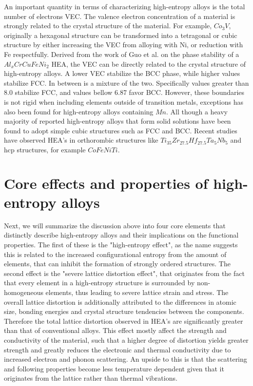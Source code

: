 An important quantity in terms of characterizing high-entropy alloys is the total number of electrons VEC. The valence electron concentration of a material is strongly related to the crystal structure of the material. For example, $Co_3V$, originally a hexagonal structure can be transformed into a tetragonal or cubic structure by either increasing the VEC from alloying with Ni, or reduction with Fe respectfully. Derived from the work of Guo et al. on the phase stability of a $Al_xCrCuFeNi_2$ HEA, the VEC can be directly related to the crystal structure of high-entropy alloys. A lower VEC stabilize the BCC phase, while higher values stabilize FCC. In between is a mixture of the two. Specifically values greater than 8.0 stabilize FCC, and values bellow 6.87 favor BCC. However, these boundaries is not rigid when including elements outside of transition metals, exceptions has also been found for high-entropy alloys containing $Mn$. All though a heavy majority of reported high-entropy alloys that form solid solutions have been found to adopt simple cubic structures such as FCC and BCC. Recent studies have observed HEA's in orthorombic structures like $Ti_{35}Zr_{27.5}Hf_{27.5}Ta_5Nb_5$ and hcp structures, for example $CoFeNiTi$.

\section{Core effects and properties of high-entropy alloys}
Next, we will summarize the discussion above into four core elements that distinctly describe high-entropy alloys and their implications on the functional properties. The first of these is the "high-entropy effect", as the name suggests this is related to the increased configurational entropy from the amount of elements, that can inhibit the formation of strongly ordered structures. The second effect is the "severe lattice distortion effect", that originates from the fact that every element in a high-entropy structure is surrounded by non-homogeneous elements, thus leading to severe lattice strain and stress. The overall lattice distortion is additionally attributed to the differences in atomic size, bonding energies and crystal structure tendencies between the components. Therefore the total lattice distortion observed in HEA's are significantly greater than that of conventional alloys. This effect mostly affect the strength and conductivity of the material, such that a higher degree of distortion yields greater strength and greatly reduces the electronic and thermal conductivity due to increased electron and phonon scattering. An upside to this is that the scattering and following properties become less temperature dependent given that it originates from the lattice rather than thermal vibrations.
 
